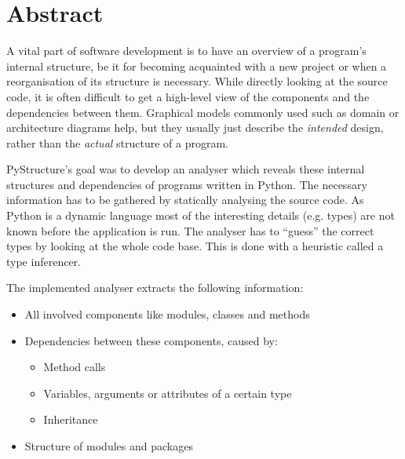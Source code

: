 \documentclass[12pt,halfparskip,DIV11,BCOR10mm]{scrreprt}
\begin{document}
\chapter*{Abstract}



A vital part of software development is to have an overview of a program's internal structure, be it for becoming acquainted with a new project or when a reorganisation of its structure is necessary. While directly looking at the source code, it is often difficult to get a high-level view of the components and the dependencies between them. Graphical models commonly used such as domain or architecture diagrams help, but they usually just describe the \emph{intended} design, rather than the \emph{actual} structure of a program. 

PyStructure's goal was to develop an analyser which reveals these internal structures and dependencies of programs written in Python. The necessary information has to be gathered by statically analysing the source code. As Python is a dynamic language most of the interesting details (e.g. types) are not known before the application is run. The analyser has to ``guess'' the correct types by looking at the whole code base. This is done with a heuristic called a type inferencer.

The implemented analyser extracts the following information:

\begin{itemize}
	\item All involved components like modules, classes and methods
	\item Dependencies between these components, caused by:
	\begin{itemize}
		\item Method calls
		\item Variables, arguments or attributes of a certain type
		\item Inheritance
	\end{itemize}
	\item Structure of modules and packages
\end{itemize}
\end{document}
